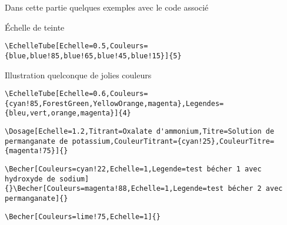 \documentclass[a4paper,12pt,dvipsnames]{report}
\begin{document}
Dans cette partie quelques exemples avec le code associé
\begin{center}



\begin{center}
Échelle de teinte
\end{center}
\begin{lstlisting}[style=A]
\EchelleTube[Echelle=0.5,Couleurs={blue,blue!85,blue!65,blue!45,blue!15}]{5}
\end{lstlisting}
\vspace{1cm}


\begin{center}
Illustration quelconque de jolies couleurs
\end{center}
\begin{lstlisting}[style=A]
\EchelleTube[Echelle=0.6,Couleurs={cyan!85,ForestGreen,YellowOrange,magenta},Legendes={bleu,vert,orange,magenta}]{4}
\end{lstlisting}
\vspace{1cm}

\Dosage[Echelle=1.2,Titrant=Oxalate d'ammonium,Titre=Solution de permanganate de potassium,CouleurTitrant={cyan!25},CouleurTitre={magenta!75}]{}
\begin{lstlisting}[style=A]
\Dosage[Echelle=1.2,Titrant=Oxalate d'ammonium,Titre=Solution de permanganate de potassium,CouleurTitrant={cyan!25},CouleurTitre={magenta!75}]{}
\end{lstlisting}
\vspace{1cm}
\Becher[Couleurs=cyan!22,Echelle=1,Legende=test bécher 1 avec hydroxyde de sodium]{}\Becher[Couleurs=magenta!88,Echelle=1,Legende=test bécher 2 avec permanganate]{}
\vspace{1cm}

\begin{lstlisting}[style=A]
\Becher[Couleurs=cyan!22,Echelle=1,Legende=test bécher 1 avec hydroxyde de sodium]{}\Becher[Couleurs=magenta!88,Echelle=1,Legende=test bécher 2 avec permanganate]{}
\end{lstlisting}
\vspace{1cm}
\begin{center}
\Becher[Couleurs=lime!75,Echelle=1]{}
\end{center}

\begin{lstlisting}[style=A]
\Becher[Couleurs=lime!75,Echelle=1]{}
\end{lstlisting}
\vspace{1cm}


\end{center}
\end{document}
